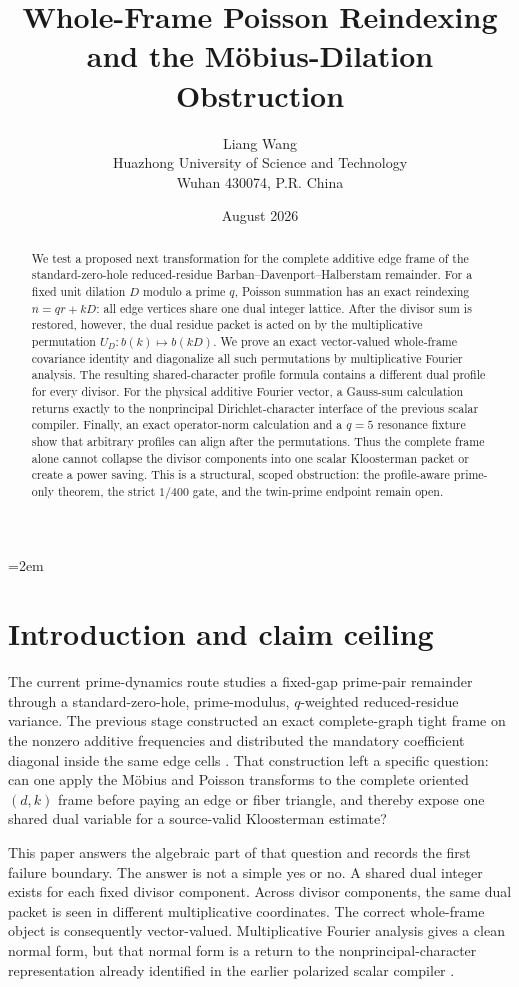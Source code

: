 \documentclass[11pt]{article}
\title{\textbf{Whole-Frame Poisson Reindexing\\
and the M\"obius-Dilation Obstruction}}
\author{Liang Wang\\
Huazhong University of Science and Technology\\
Wuhan 430074, P.R. China}
\date{August 2026}
\begin{document}
\emergencystretch=2em
\maketitle

\begin{abstract}
We test a proposed next transformation for the complete additive edge frame
of the standard-zero-hole reduced-residue Barban--Davenport--Halberstam
remainder.  For a fixed unit dilation $D$ modulo a prime $q$, Poisson summation
has an exact reindexing $n=qr+kD$: all edge vertices share one dual integer
lattice.  After the divisor sum is restored, however, the dual residue packet
is acted on by the multiplicative permutation $U_D:b(k)\mapsto b(kD)$.
We prove an exact vector-valued whole-frame covariance identity and diagonalize
all such permutations by multiplicative Fourier analysis.  The resulting
shared-character profile formula contains a different dual profile for every
divisor.  For the physical additive Fourier vector, a Gauss-sum calculation
returns exactly to the nonprincipal Dirichlet-character interface of the
previous scalar compiler.  Finally, an exact operator-norm calculation and a
$q=5$ resonance fixture show that arbitrary profiles can align after the
permutations.  Thus the complete frame alone cannot collapse the divisor
components into one scalar Kloosterman packet or create a power saving.  This
is a structural, scoped obstruction: the profile-aware prime-only theorem,
the strict $1/400$ gate, and the twin-prime endpoint remain open.
\end{abstract}

\section{Introduction and claim ceiling}

The current prime-dynamics route studies a fixed-gap prime-pair remainder
through a standard-zero-hole, prime-modulus, $q$-weighted reduced-residue
variance.  The previous stage constructed an exact complete-graph tight frame
on the nonzero additive frequencies and distributed the mandatory coefficient
diagonal inside the same edge cells \cite{Wang2026TPC208}.  That construction
left a specific question: can one apply the Möbius and Poisson transforms to
the complete oriented $(d,k)$ frame before paying an edge or fiber triangle,
and thereby expose one shared dual variable for a source-valid Kloosterman
estimate?

This paper answers the algebraic part of that question and records the first
failure boundary.  The answer is not a simple yes or no.  A shared dual
integer exists for each fixed divisor component.  Across divisor components,
the same dual packet is seen in different multiplicative coordinates.  The
correct whole-frame object is consequently vector-valued.  Multiplicative
Fourier analysis gives a clean normal form, but that normal form is a return to
the nonprincipal-character representation already identified in the earlier
polarized scalar compiler \cite{Wang2026V59}.
\end{document}

